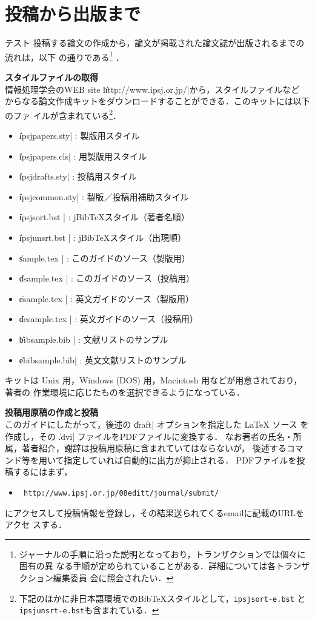 \section{投稿から出版まで}\label{sec:Enum}\label{sec:item}
テスト
投稿する論文の作成から，論文が掲載された論文誌が出版されるまでの流れは，以下
の通りである\footnote[2]{%
%
ジャーナルの手順に沿った説明となっており，トランザクションでは個々に固有の異
なる手順が定められていることがある．詳細については各トランザクション編集委員
会に照会されたい．}
．
%
\begin{Enumerate}%
\item {\bf スタイルファイルの取得}\\
情報処理学会のWEB site \|http://www.ipsj.or.jp/|から，スタイルファイルなど
からなる論文作成キットをダウンロードすることができる．このキットには以下のファ
イルが含まれている\footnote[3]{%
%
下記のほかに非日本語環境でのBib{\TeX}スタイルとして，\texttt{ipsjsort-e.bst}
と\texttt{ipsjunsrt-e.bst}も含まれている．}．
%
\begin{itemize}%
\item\|ipsjpapers.sty| : 製版用スタイル
\item\|ipsjpapers.cls| : {\LATEXe} 用製版用スタイル
\item\|ipsjdrafts.sty| : 投稿用スタイル
\item\|ipsjcommon.sty| : 製版／投稿用補助スタイル
\item\|ipsjsort.bst  | : jBib{\TeX}スタイル（著者名順）
\item\|ipsjunsrt.bst | : jBib{\TeX}スタイル（出現順）
\item\|sample.tex    | : このガイドのソース（製版用）
\item\|dsample.tex   | : このガイドのソース（投稿用）
\item\|esample.tex   | : 英文ガイドのソース（製版用）
\item\|desample.tex  | : 英文ガイドのソース（投稿用）
\item\|bibsample.bib | : 文献リストのサンプル
\item\|ebibsample.bib| : 英文文献リストのサンプル
\end{itemize}%
%
キットは Unix 用，Windows (DOS) 用，Macintosh 用などが用意されており，著者の
作業環境に応じたものを選択できるようになっている．

\item {\bf 投稿用原稿の作成と投稿}\\
このガイドにしたがって，後述の \|draft| オプションを指定した {\LaTeX} ソース
を作成し，その \|.dvi| ファイルをPDFファイルに変換する．
なお著者の氏名・所属，著者紹介，謝辞は投稿用原稿に含まれていてはならないが，
後述するコマンド等を用いて指定していれば自動的に出力が抑止される．
PDFファイルを投稿するにはまず，
\begin{itemize}\item[]\tt
http://www.ipsj.or.jp/08editt/journal/submit/
\end{itemize}
にアクセスして投稿情報を登録し，その結果送られてくるemailに記載のURLをアクセ
スする．


\end{Enumerate}
